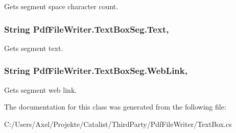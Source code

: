 Gets segment space character count. 

\subsubsection[{\texorpdfstring{Text}{Text}}]{\setlength{\rightskip}{0pt plus 5cm}String Pdf\+File\+Writer.\+Text\+Box\+Seg.\+Text\hspace{0.3cm}{\ttfamily [get]}, {\ttfamily [set]}}\hypertarget{class_pdf_file_writer_1_1_text_box_seg_a6627d3190c71a21b2e71df5cf4fd6ed8}{}\label{class_pdf_file_writer_1_1_text_box_seg_a6627d3190c71a21b2e71df5cf4fd6ed8}


Gets segment text. 

\subsubsection[{\texorpdfstring{Web\+Link}{WebLink}}]{\setlength{\rightskip}{0pt plus 5cm}String Pdf\+File\+Writer.\+Text\+Box\+Seg.\+Web\+Link\hspace{0.3cm}{\ttfamily [get]}, {\ttfamily [set]}}\hypertarget{class_pdf_file_writer_1_1_text_box_seg_ab5cbd106a7fa8a82e7bf5af77b961881}{}\label{class_pdf_file_writer_1_1_text_box_seg_ab5cbd106a7fa8a82e7bf5af77b961881}


Gets segment web link. 



The documentation for this class was generated from the following file\+:\begin{DoxyCompactItemize}
\item 
C\+:/\+Users/\+Axel/\+Projekte/\+Catalist/\+Third\+Party/\+Pdf\+File\+Writer/Text\+Box.\+cs\end{DoxyCompactItemize}
